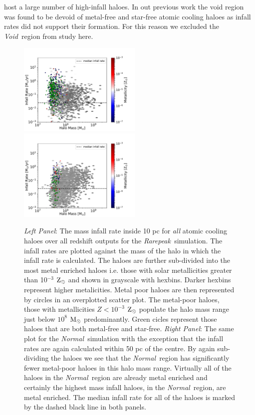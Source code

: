 \documentclass[graphics, twocolumn, usenatbib]{mn2e}
\newcommand{\msolar} {$\rm{M_{\odot}}~$}
\newcommand{\zsolar} {$\rm{Z_{\odot}}~$}
\newcommand{\rarepeak} {\textit{Rarepeak~}}
\newcommand{\normal} {\textit{Normal~}}
\newcommand{\void} {\textit{Void~}}
\begin{document}
host a large number of high-infall haloes. In out previous work
\citep{Wise_2019, Regan_2019} the void region was found to be devoid of metal-free and star-free atomic cooling haloes as infall rates
did not support their formation. For this reason we excluded the 
\void region from study here. 
\begin{figure}
\centering
\begin{minipage}{175mm}      \begin{center} 
\centerline{
\includegraphics[width=0.525\textwidth]{FIGURES/Rarepeak_MdotMHaloZ_Hexbin.pdf}
\includegraphics[width=0.525\textwidth]{FIGURES/Normal_MdotMHaloZ_Hexbin.pdf}}
\caption{\textit{Left Panel}: The mass infall rate inside 10 pc for \textit{all} atomic
  cooling haloes over all redshift outputs for the \rarepeak simulation. The infall rates
  are plotted against the mass of the halo in which the infall rate is
  calculated. The haloes are further sub-divided into the most metal enriched haloes
  i.e. those with solar metallicities greater than 10$^{-3}$ \zsolar and shown in grayscale with
  hexbins. Darker hexbins represent higher metalicities. Metal poor haloes are then represented
  by circles in an overplotted scatter plot. The metal-poor haloes, those with metallicities
  $Z < 10^{-3}$ \zsolar populate the halo mass range just below $10^{8}$ \msolar predominantly.
  Green cicles represent those haloes that are both metal-free and star-free. 
  \textit{Right Panel}: The same plot for the \normal simulation with the exception that the infall
  rates are again calculated within 50 pc of the centre. By again sub-dividing the haloes we see
  that the \normal region has significantly fewer metal-poor haloes in this halo mass range.
  Virtually all of the haloes in the \normal region are already metal enriched and certainly the
  highest mass infall haloes, in the \normal region, are metal enriched. 
  The median infall rate for all of the haloes is marked by the dashed black line in both panels.}
\label{Fig:HaloMass}
\end{center} \end{minipage}


\end{figure}
\end{document}
